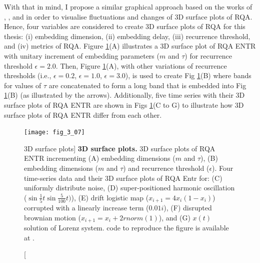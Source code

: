 With that in mind, I propose a similar graphical approach 
based on the works of \cite{zbilut1992}, \cite{webber2018}, 
and \cite{marwan2015} in order to visualise fluctuations 
and changes of 3D surface plots of RQA.
Hence, four variables are considered to create 3D surface 
plots of RQA for this thesis: 
(i) embedding dimension,
(ii) embedding delay,
(iii) recurrence threshold, and 
(iv) metrics of RQA. 
Figure \ref{fig:fig_37}(A) illustrates a 3D surface plot of RQA ENTR  
with unitary increment of embedding parameters ($m$ and $\tau$)
for recurrence threshold $\epsilon=2.0$.
Then, Figure \ref{fig:fig_37}(A), 
with other variations of recurrence thresholds 
(i.e., $\epsilon=0.2$, $\epsilon=1.0$, $\epsilon=3.0$), 
is used to create Fig \ref{fig:fig_37}(B) where bands 
for values of $\tau$ are concatenated to form a long band
that is embedded into Fig \ref{fig:fig_37}(B) 
(as illustrated by the arrows).
Additionally, five time series with their 3D surface plots of 
RQA ENTR are shown in Figs \ref{fig:fig_37}(C to G)
to illustrate how 3D surface plots of RQA ENTR differ from each other.
\begin{figure}
  \centering
    \texttt{[image: fig\_3\_07]}
    \caption
	[3D surface plots]{
	{\bf 3D surface plots.} 
	3D surface plots of RQA ENTR incrementing 
	(A) embedding dimensions ($m$ and $\tau$),
	(B) embedding dimensions ($m$ and $\tau$) and
	recurrence threshold ($\epsilon$).
	Four time-series data and their 3D surface plots of 
	RQA Entr for:
	(C) uniformly distribute noise,
	(D) super-positioned harmonic oscillation 
	($\sin{ \frac{1}{5} t} \sin{ \frac{5}{100}t) }$),
	(E) drift logistic map ($x_{i+1} = 4 x_i (1- x_i) $) corrupted 
	with a linearly increase term ($0.01 i$),
	(F) disrupted brownian motion  ($x_{i+1} = x_i + 2rnorm(1) $), and
	(G) $x(t)$ solution of Lorenz system.
	\R code to reproduce the figure is available at 
	.
	}
    \label{fig:fig_37}
\end{figure}

